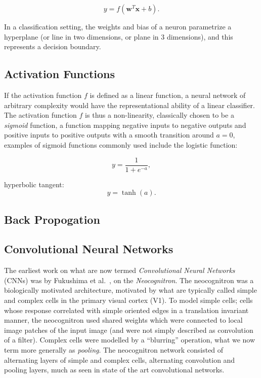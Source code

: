 \documentclass[thesis]{subfiles}
\begin{document}
\begin{equation}
y = f(\mathbf{w}^T\mathbf{x} + b).
\end{equation}

In a classification setting, the weights and bias of a neuron parametrize a hyperplane (or line in two dimensions, or plane in 3 dimensions), and this represents a decision boundary.

\subsection{Activation Functions}
If the activation function $f$ is defined as a linear function, a neural network of arbitrary complexity would have the representational ability of a linear classifier. The activation function $f$ is thus a non-linearity, classically chosen to be a \emph{sigmoid} function, \ie a function mapping negative inputs to negative outputs and positive inputs to positive outputs with a smooth transition around $a = 0$, examples of sigmoid functions commonly used include the logistic function: 

\begin{equation}
	y = \frac{1}{1+e^{-a}},
\end{equation}

hyperbolic tangent:
\begin{equation}
	y = \tanh(a).
\end{equation}

\subsection{Back Propogation}

\subsection{Convolutional Neural Networks}
The earliest work on what are now termed \emph{Convolutional Neural Networks} (CNNs) was by Fukushima et al.~\cite{Fuk80,fukushima2013artificial}, on the \emph{Neocognitron}. The neocognitron was a biologically motivated architecture, motivated by what are typically called simple and complex cells in the primary visual cortex (V1). To model simple cells; cells whose response correlated with simple oriented edges in a translation invariant manner, the neocognitron used shared weights which were connected to local image patches of the input image (and were not simply described as convolution of a filter). Complex cells were modelled by a ``blurring'' operation, what we now term more generally as \emph{pooling}. The neocognitron network consisted of alternating layers of simple and complex cells, \ie alternating convolution and pooling layers, much as seen in state of the art convolutional networks.
\end{document}
